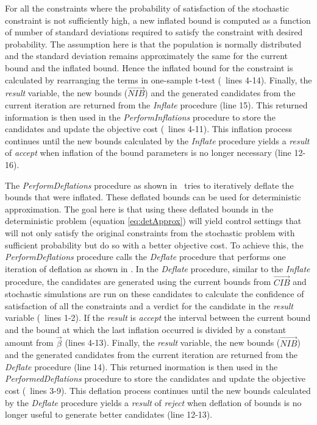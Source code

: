 \documentclass[a4paper, 12pt]{article} %
\begin{document}
For all the constraints where the probability of satisfaction of the stochastic constraint is not sufficiently high, a new inflated bound is computed as a function of number of standard deviations required to satisfy the constraint with desired probability. The assumption here is that the population is normally distributed and the standard deviation remains approximately the same for the current bound and the inflated bound. Hence the inflated bound for the constraint is calculated by rearranging the terms in one-sample t-test (\algoInflate~lines 4-14). 
Finally, the \textit{result} variable, the new bounds ($\overrightarrow{NIB}$) and the generated candidates from the current iteration are returned from the \textit{Inflate} procedure (line 15). 
This returned information is then used in the \textit{PerformInflations} procedure to store the candidates and update the objective cost (\algoPerfInfl~lines 4-11). This inflation process continues until the new bounds calculated by the \textit{Inflate} procedure yields a \textit{result} of \textit{accept} when inflation of the bound parameters is no longer necessary (line 12-16).

The \textit{PerformDeflations} procedure as shown in \algoPerfDefl~tries to iteratively deflate the bounds that were inflated. These deflated bounds can be used for deterministic approximation. The goal here is that using these deflated bounds in the deterministic problem (equation \ref{eq:detApprox}) will yield control settings that will not only satisfy the original constraints from the stochastic problem with sufficient probability but do so with a better objective cost.  
To achieve this, the \textit{PerformDeflations} procedure calls the \textit{Deflate} procedure that performs one iteration of deflation as shown in \algoDeflate. 
In the \textit{Deflate} procedure, similar to the \textit{Inflate} procedure, the candidates are generated using the current bounds from $\overrightarrow{CIB}$ and stochastic simulations are run on these candidates to calculate the confidence of satisfaction of all the constraints and a verdict for the candidate in the \textit{result} variable (\algoDeflate~lines 1-2). 
If the \textit{result} is \textit{accept} the interval between the current bound and the bound at which the last inflation occurred is divided by a constant amount from $\vec{\beta}$ (lines 4-13). 
Finally, the \textit{result} variable, the new bounds ($\overrightarrow{NIB}$) and the generated candidates from the current iteration are returned from the \textit{Deflate} procedure (line 14). 
This returned inormation is then used in the \textit{PerformedDeflations} procedure to store the candidates and update the objective cost (\algoPerfDefl~lines 3-9). This deflation process continues until the new bounds calculated by the \textit{Deflate} procedure yields a \textit{result} of \textit{reject} when deflation of bounds is no longer useful to  generate better candidates (line 12-13).
\end{document}
